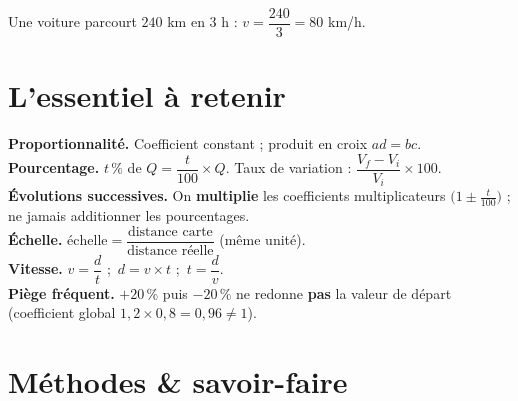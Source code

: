 \begin{illus}
\end{illus}

\begin{exemple}
Une voiture parcourt $240$ km en $3$ h : $v=\dfrac{240}3=80$ km/h.
\end{exemple}

\section{L'essentiel à retenir}

\begin{synthese}
\textbf{Proportionnalité.} Coefficient constant ; produit en croix $ad=bc$.\\[4pt]
\textbf{Pourcentage.} $t\,\%$ de $Q=\dfrac t{100}\times Q$. Taux de variation :
$\dfrac{V_f-V_i}{V_i}\times100$.\\[4pt]
\textbf{Évolutions successives.} On \textbf{multiplie} les coefficients multiplicateurs
$\big(1\pm\frac t{100}\big)$ ; ne jamais additionner les pourcentages.\\[4pt]
\textbf{Échelle.} $\text{échelle}=\dfrac{\text{distance carte}}{\text{distance réelle}}$
(même unité).\\[4pt]
\textbf{Vitesse.} $v=\dfrac dt$ ;\ $d=v\times t$ ;\ $t=\dfrac dv$.\\[4pt]
\textbf{Piège fréquent.} $+20\,\%$ puis $-20\,\%$ ne redonne \textbf{pas} la valeur de
départ (coefficient global $1{,}2\times0{,}8=0{,}96\ne1$).
\end{synthese}

\section{Méthodes \& savoir-faire}

